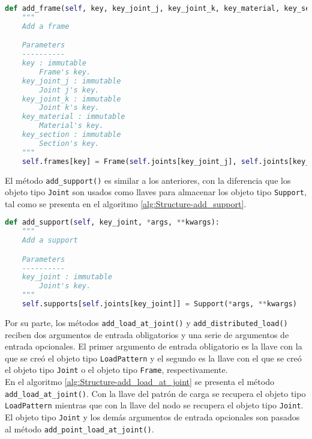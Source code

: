 \begin{lstlisting}[language=Python,caption=Método \texttt{add\_frame()} de la clase \texttt{Structure}.,label=alg:Structure-add_frame, frame=single]
def add_frame(self, key, key_joint_j, key_joint_k, key_material, key_section):
    """
    Add a frame

    Parameters
    ----------
    key : immutable
        Frame's key.
    key_joint_j : immutable
        Joint j's key.
    key_joint_k : immutable
        Joint k's key.
    key_material : immutable
        Material's key.
    key_section : immutable
        Section's key.
    """
    self.frames[key] = Frame(self.joints[key_joint_j], self.joints[key_joint_k], self.materials[key_material], self.sections[key_section])
\end{lstlisting}
\bigskip
El método \verb|add_support()| es similar a los anteriores, con la diferencia que los objeto tipo \verb|Joint| son usados como llaves para almacenar los objeto tipo \verb|Support|, tal como se presenta en el algoritmo \ref{alg:Structure-add_support}.\\

\begin{lstlisting}[language=Python,caption=Método \texttt{add\_support()} de la clase \texttt{Structure}.,label=alg:Structure-add_support, frame=single]
def add_support(self, key_joint, *args, **kwargs):
    """
    Add a support

    Parameters
    ----------
    key_joint : immutable
        Joint's key.
    """
    self.supports[self.joints[key_joint]] = Support(*args, **kwargs)
\end{lstlisting}
\bigskip
Por su parte, los métodos \verb|add_load_at_joint()| y \verb|add_distributed_load()| reciben dos argumentos de entrada obligatorios y una serie de argumentos de entrada  opcionales. El primer argumento de entrada obligatorio es la llave con la que se creó el objeto tipo \verb|LoadPattern| y el segundo es la llave con el que se creó el objeto tipo \verb|Joint| o el objeto tipo \verb|Frame|, respectivamente.\\

En el algoritmo \ref{alg:Structure-add_load_at_joint} se presenta el método \verb|add_load_at_joint()|. Con la llave del patrón de carga se recupera el objeto tipo \verb|LoadPattern| mientras que con la llave del nodo se recupera el objeto tipo \verb|Joint|. El objeto tipo \verb|Joint| y los demás argumentos de entrada opcionales son pasados al método \verb|add_point_load_at_joint()|.\\


